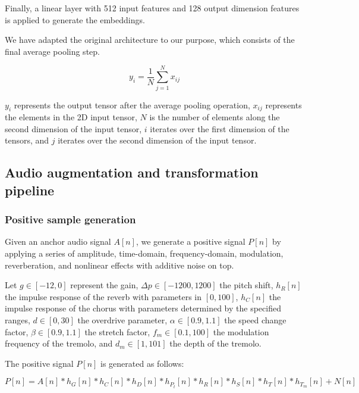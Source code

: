 Finally, a linear layer with 512 input features and 128 output dimension features is applied to generate the embeddings.



We have adapted the original architecture to our purpose, which consists of the final average pooling step.

\begin{equation}
y_i = \frac{1}{N} \sum_{j=1}^{N} x_{ij}
\end{equation}

$y_i$ represents the output tensor after the average pooling operation, $x_{ij}$ represents the elements in the 2D input tensor, $N$ is the number of elements along the second dimension of the input tensor, $i$ iterates over the first dimension of the tensors, and $j$ iterates over the second dimension of the input tensor.

\subsection{Audio augmentation and transformation pipeline}

\subsubsection{Positive sample generation}
Given an anchor audio signal $A[n]$, we generate a positive signal $P[n]$ by applying a series of amplitude, time-domain, frequency-domain, modulation, reverberation, and nonlinear effects with additive noise on top. 

Let $g \in [-12, 0]$ represent the gain, $\Delta p \in [-1200, 1200]$ the pitch shift, $h_R[n]$ the impulse response of the reverb with parameters in $[0, 100]$, $h_C[n]$ the impulse response of the chorus with parameters determined by the specified ranges, $d \in [0, 30]$ the overdrive parameter, $\alpha \in [0.9, 1.1]$ the speed change factor, $\beta \in [0.9, 1.1]$ the stretch factor, $f_m \in [0.1, 100]$ the modulation frequency of the tremolo, and $d_m \in [1, 101]$ the depth of the tremolo. 

The positive signal $P[n]$ is generated as follows:

\begin{equation}\label{eq:positive_signal}
P[n] = A[n] \ast h_{G}[n] \ast h_{C}[n] \ast h_{D}[n] \ast h_{P_t}[n] \ast h_{R}[n] \ast h_{S}[n] \ast h_{T}[n] \ast h_{T_m}[n] + N[n]
\end{equation}

